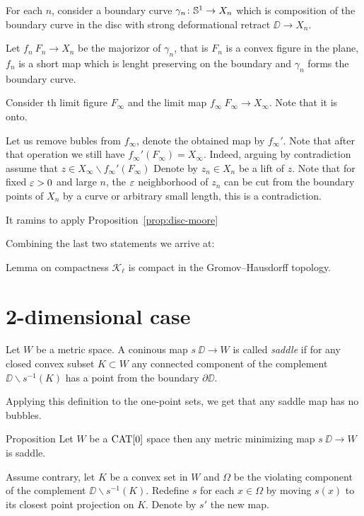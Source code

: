 \documentclass[a4paper,10pt]{amsart}
\begin{document}
For each $n$, consider a boundary curve $\gamma_n\colon\mathbb{S}^1\to X_n$
which is composition of the boundary curve in the disc with 
strong deformational retract $\DD\to X_n$.

Let $f_n\:F_n\to X_n$ be the majorizor of $\gamma_n$,
that is $F_n$ is a convex figure in the plane,
$f_n$ is a short map which is lenght preserving on the boundary and $\gamma_n$ forms the boundary curve.

Consider th limit figure $F_\infty$ and the limit map $f_\infty\:F_\infty\to X_\infty$.
Note that it is onto.

Let us remove bubles from $f_\infty$, denote the obtained map by $f_\infty'$.
Note that after that operation we still have $f_\infty'(F_\infty)=X_\infty$.
Indeed, arguing by contradiction assume that $z\in X_\infty\backslash f_\infty'(F_\infty)$
Denote by $z_n\in X_n$ be a lift of $z$.
Note that for fixed $\varepsilon>0$ and large $n$, 
the $\varepsilon$ neighborhood of $z_n$ can be cut from the boundary points of $X_n$ by a curve or arbitrary small length,
this is a contradiction.

It ramins to apply Proposition~\ref{prop:disc-moore}
\qeds

Combining the last two statements we arrive at:

\begin{thm}{Lemma on compactness}\label{lem:compact}
$\mathcal{K}_\ell$ is compact in the Gromov--Hausdorff topology.
\end{thm}

\section{2-dimensional case}

Let $W$ be a metric space.
A coninous map $s\:\DD\to W$ is called \emph{saddle} if for any closed convex subset $K\subset W$ 
any connected component of the complement $\DD\backslash s^{-1}(K)$
has a point from the boundary $\partial \DD$.

Applying this definition to the one-point sets,
we get that any saddle map has no bubbles.


\begin{thm}{Proposition}
Let $W$ be a $\mathop{\rm CAT}\nolimits[0]$ space then any metric minimizing map $s\:\DD\to W$ is saddle.
\end{thm}

Assume contrary, let $K$ be a convex set in $W$
and $\Omega$ be the violating component of the complement $\DD\backslash s^{-1}(K)$.
Redefine $s$ for each $x\in\Omega$ by moving 
$s(x)$ to its closest point projection on $K$.
Denote by $s'$ the new map.
\end{document}
